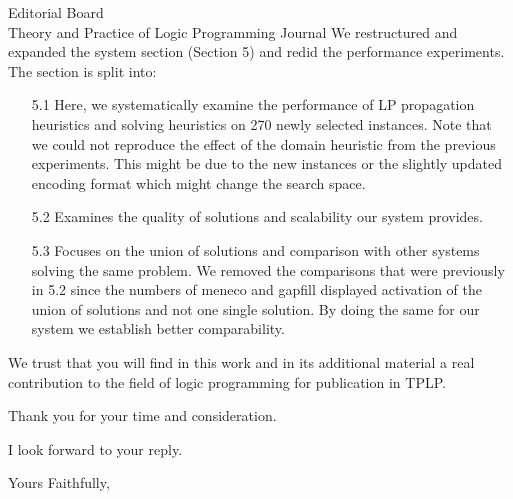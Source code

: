 \documentclass{letter}
\begin{document}
\begin{letter}{Editorial Board \\ Theory and Practice of Logic Programming Journal}
We restructured and expanded the system section (Section 5) and redid the performance experiments.
The section is split into:
	\begin{itemize}
		\item[5.1] Here, we systematically examine the performance of LP propagation heuristics and solving heuristics on 270 newly selected instances. Note that we could not reproduce the effect of the domain heuristic from the previous experiments. This might be due to the new instances or the slightly updated encoding format which might change the search space.
		\item[5.2] Examines the quality of solutions and scalability our system provides.
		\item[5.3] Focuses on the union of solutions and comparison with other systems solving the same problem. We removed the comparisons that were previously in 5.2 since the numbers of meneco and gapfill displayed activation of the union of solutions and not one single solution. By doing the same for our system we establish better comparability.
	\end{itemize}

We trust that you will find in this work and in its additional material a real contribution to the field of logic programming for publication in TPLP.

Thank you for your time and consideration.

I look forward to your reply.

\closing{Yours Faithfully,}

\end{letter}
\end{document}
